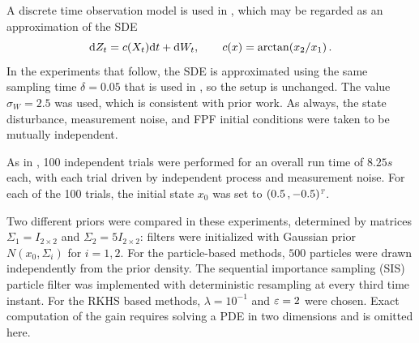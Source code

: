 A discrete time observation model is used in \cite{budchelee07}, which may be regarded as an approximation of the
SDE
\[
\text{d} Z_t = c(X_t)\text{d} t + \text{d} W_t,\qquad   c(x) = \arctan(x_2/x_1)\, .
\]
In the experiments that follow, the SDE is approximated using the same sampling time $\delta =0.05$ that is used in  \cite{budchelee07}, so the setup is unchanged.   The value $\sigma_W =2.5$ was used, which is consistent with prior work.
As always, the state disturbance, measurement noise,  and FPF initial conditions were taken to be mutually independent.


As in \cite{budchelee07,tilghiomeh13}, 100 independent trials were performed for an overall run time of $8.25s$ each,
with each trial driven by independent process and measurement noise. For each of the 100 trials, the initial state $x_0$ was set to $(0.5 \, , -0.5)^{\hbox{\tiny\it T}}$.

Two different priors were compared in these experiments, determined by matrices $\Sigma_1 = I_{2\times 2}$ and $ \Sigma_2 = 5 I_{2\times2}$:   filters were initialized with Gaussian prior $N(x_0, \Sigma_i)$ for $i=1,2$. For the particle-based methods, $500$ particles were drawn independently from the prior density. The sequential importance sampling (SIS) particle filter was implemented with deterministic resampling at every third time instant.  For the RKHS based methods, $\lambda = 10^{-1}$ and $\varepsilon = 2$ were chosen. Exact computation of the gain requires solving a PDE in two dimensions and is omitted here.

